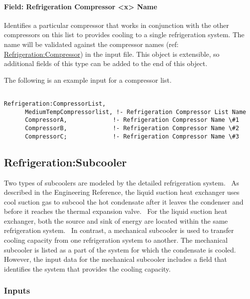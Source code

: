 \paragraph{Field: Refrigeration Compressor \textless{}x\textgreater{} Name}\label{field-refrigeration-compressor-x-name}

Identifies a particular compressor that works in conjunction with the other compressors on this list to provides cooling to a single refrigeration system. The name will be validated against the compressor names (ref: \hyperref[refrigerationcompressor]{Refrigeration:Compressor}) in the input file.  This object is extensible, so additional fields of this type can be added to the end of this object.

The following is an example input for a compressor list.

\begin{lstlisting}

Refrigeration:CompressorList,
      MediumTempCompressorlist, !- Refrigeration Compressor List Name
      CompressorA,             !- Refrigeration Compressor Name \#1
      CompressorB,             !- Refrigeration Compressor Name \#2
      CompressorC;             !- Refrigeration Compressor Name \#3
\end{lstlisting}

\subsection{Refrigeration:Subcooler}\label{refrigerationsubcooler}

Two types of subcoolers are modeled by the detailed refrigeration system.~ As described in the Engineering Reference, the liquid suction heat exchanger uses cool suction gas to subcool the hot condensate after it leaves the condenser and before it reaches the thermal expansion valve.~ For the liquid suction heat exchanger, both the source and sink of energy are located within the same refrigeration system.~ In contrast, a mechanical subcooler is used to transfer cooling capacity from one refrigeration system to another. The mechanical subcooler is listed as a part of the system for which the condensate is cooled.~ However, the input data for the mechanical subcooler includes a field that identifies the system that provides the cooling capacity.

\subsubsection{Inputs}\label{inputs-7-020}

